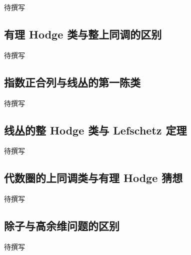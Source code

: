 
% 
% 
% 
% 


待撰写

\subsection{有理 Hodge 类与整上同调的区别}
\label{g4:subsec:1707:01}
待撰写

\subsection{指数正合列与线丛的第一陈类}
\label{g4:subsec:1707:02}
待撰写

\subsection{线丛的整 Hodge 类与 Lefschetz 定理}
\label{g4:subsec:1707:03}
待撰写

\subsection{代数圈的上同调类与有理 Hodge 猜想}
\label{g4:subsec:1707:04}
待撰写

\subsection{除子与高余维问题的区别}
\label{g4:subsec:1707:05}
待撰写

